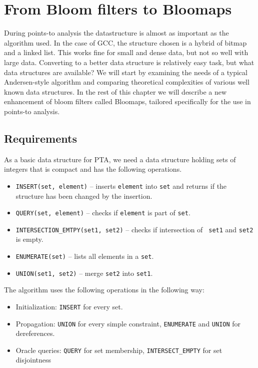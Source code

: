 \chapter{From Bloom filters to Bloomaps}

During points-to analysis the datastructure is almost as important as the
algorithm used. In the case of GCC, the structure chosen is a hybrid of bitmap
and a linked list. This works fine for small and dense data, but not so well
with large data. Converting to a better data structure is relatively easy task, but what data
structures are available? We will start by examining the needs of a typical
Andersen-style algorithm and comparing theoretical complexities of various well
known data structures. In the rest of this chapter we will describe a new
enhancement of bloom filters called Bloomaps, tailored specifically for the use
in points-to analysis.

\section{Requirements}

As a basic data structure for PTA, we need a data structure holding sets of
integers that is compact and has the following operations.

\begin{itemize}
	\item {\tt INSERT(set, element)} -- inserts {\tt element} into {\tt set} and returns if
		the structure has been changed by the insertion.
	\item {\tt QUERY(set, element)} -- checks if {\tt element} is part of {\tt set}.
	\item {\tt INTERSECTION\_EMTPY(set1, set2)} -- checks if intersection of {\tt
		set1} and {\tt set2} is empty.
	\item {\tt ENUMERATE(set)} -- lists all elements in a {\tt set}.
	\item {\tt UNION(set1, set2)} -- merge {\tt set2} into {\tt set1}.
\end{itemize}

The algorithm uses the following operations in the following way:

\begin{itemize}
	\item Initialization: {\tt INSERT} for every set.
	\item Propagation: {\tt UNION} for every simple constraint, {\tt ENUMERATE} and
		{\tt UNION} for dereferences.
	\item Oracle queries: {\tt QUERY} for set membership, {\tt INTERSECT\_EMPTY}
		for set disjointness
\end{itemize}


